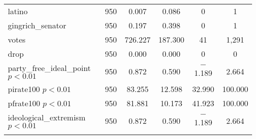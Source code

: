 \documentclass[12pt]{article}
\begin{document}
\begin{table}[!htbp]
\begin{tabular}{@{\extracolsep{5pt}}lccccc}
		latino & 950 & 0.007 & 0.086 & 0 & 1 \\ 
		gingrich\_senator & 950 & 0.197 & 0.398 & 0 & 1 \\ 
		votes & 950 & 726.227 & 187.300 & 41 & 1,291 \\ 
		drop & 950 & 0.000 & 0.000 & 0 & 0 \\ 
		\hline
		party\_free\_ideal\_point $ p < 0.01 $ & 950 & 0.872 & 0.590 & $-$1.189 & 2.664 \\ 
		pirate100 $ p < 0.01 $ & 950 & 83.255 & 12.598 & 32.990 & 100.000 \\ 
		pfrate100 $ p < 0.01 $ & 950 & 81.881 & 10.173 & 41.923 & 100.000 \\ 
		ideological\_extremism $ p < 0.01 $ & 950 & 0.872 & 0.590 & $-$1.189 & 2.664 \\  
		\hline \\[-1.8ex] 
	\end{tabular} 
\end{table} 
\end{document}
